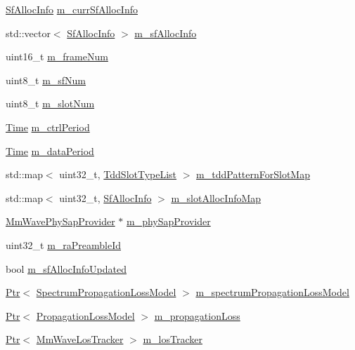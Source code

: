 \begin{DoxyCompactItemize}
\item 
\hyperlink{structns3_1_1SfAllocInfo}{Sf\+Alloc\+Info} \hyperlink{classns3_1_1MmWavePhy_adf1e91c9da8a1d3f82b1517363cddbe8}{m\+\_\+curr\+Sf\+Alloc\+Info}
\item 
std\+::vector$<$ \hyperlink{structns3_1_1SfAllocInfo}{Sf\+Alloc\+Info} $>$ \hyperlink{classns3_1_1MmWavePhy_a6e7002b99b8c50976033e0b96523f08c}{m\+\_\+sf\+Alloc\+Info}
\item 
uint16\+\_\+t \hyperlink{classns3_1_1MmWavePhy_a852ce585035a1c12122d2775e64ff38a}{m\+\_\+frame\+Num}
\item 
uint8\+\_\+t \hyperlink{classns3_1_1MmWavePhy_af3d76eb9f3e5e1ff669852d05986c1a3}{m\+\_\+sf\+Num}
\item 
uint8\+\_\+t \hyperlink{classns3_1_1MmWavePhy_a6c83cdb8c36a9a58ae8b9f17933680ac}{m\+\_\+slot\+Num}
\item 
\hyperlink{classns3_1_1Time}{Time} \hyperlink{classns3_1_1MmWavePhy_a4a922ac376aa1e0dbdeb0c2e889a2558}{m\+\_\+ctrl\+Period}
\item 
\hyperlink{classns3_1_1Time}{Time} \hyperlink{classns3_1_1MmWavePhy_a0c8b648880b5f1c7a05216f5f6d07eec}{m\+\_\+data\+Period}
\item 
std\+::map$<$ uint32\+\_\+t, \hyperlink{namespacens3_a74052c5410c5c8e0028017dbf985cd1f}{Tdd\+Slot\+Type\+List} $>$ \hyperlink{classns3_1_1MmWavePhy_a5988588aa321367f2df602defe314d28}{m\+\_\+tdd\+Pattern\+For\+Slot\+Map}
\item 
std\+::map$<$ uint32\+\_\+t, \hyperlink{structns3_1_1SfAllocInfo}{Sf\+Alloc\+Info} $>$ \hyperlink{classns3_1_1MmWavePhy_acfaa60c1b3abf4b31d15cc8d41cc54a4}{m\+\_\+slot\+Alloc\+Info\+Map}
\item 
\hyperlink{classns3_1_1MmWavePhySapProvider}{Mm\+Wave\+Phy\+Sap\+Provider} $\ast$ \hyperlink{classns3_1_1MmWavePhy_a4f271a1ffff7573d6a6b0eec5ddf006c}{m\+\_\+phy\+Sap\+Provider}
\item 
uint32\+\_\+t \hyperlink{classns3_1_1MmWavePhy_a671378769e45c75b0ad2fc95299af6ec}{m\+\_\+ra\+Preamble\+Id}
\item 
bool \hyperlink{classns3_1_1MmWavePhy_a1990ac9963777852ea063c53ac0b5304}{m\+\_\+sf\+Alloc\+Info\+Updated}
\item 
\hyperlink{classns3_1_1Ptr}{Ptr}$<$ \hyperlink{classns3_1_1SpectrumPropagationLossModel}{Spectrum\+Propagation\+Loss\+Model} $>$ \hyperlink{classns3_1_1MmWavePhy_a3d7feea996066a51496915c8c232daa4}{m\+\_\+spectrum\+Propagation\+Loss\+Model}
\item 
\hyperlink{classns3_1_1Ptr}{Ptr}$<$ \hyperlink{classns3_1_1PropagationLossModel}{Propagation\+Loss\+Model} $>$ \hyperlink{classns3_1_1MmWavePhy_ae16faa8d6eeee2cc0cc712b0ccb62064}{m\+\_\+propagation\+Loss}
\item 
\hyperlink{classns3_1_1Ptr}{Ptr}$<$ \hyperlink{classns3_1_1MmWaveLosTracker}{Mm\+Wave\+Los\+Tracker} $>$ \hyperlink{classns3_1_1MmWavePhy_a614158bb98ad735dc185e0d6eccc51a0}{m\+\_\+los\+Tracker}
\end{DoxyCompactItemize}
